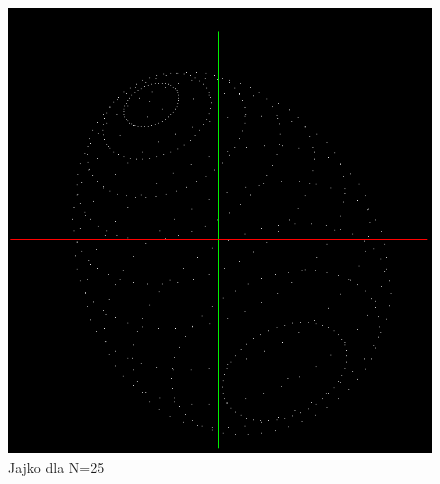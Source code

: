 \documentclass[wide,a4paper,titlepage,12pt] {article}
\begin{document}
\begin{figure}[htbp]
	 		\begin{center}
         \includegraphics[scale=0.7]{j1.PNG}
      \caption{Jajko dla N=25 }
     \end{center}
     \end{figure}
\newpage
\end{document}

